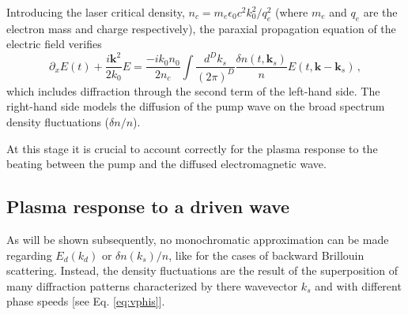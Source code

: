 \documentclass[
 reprint,
 amsmath,amssymb,
 aps,
]{revtex4-1}
\begin{document}
Introducing the laser critical density, $n_c = m_e \epsilon_0c^2 k_0^2/q_e^2 $ (where  $m_e$ and  $q_e$ are the  electron mass and charge respectively), the  paraxial propagation equation of the electric field verifies 
\begin{equation}
    \partial_x E(t) +\frac{i\mathbf{k}^2}{2k_0}E=\frac{-ik_0n_0}{2n_c} \int \frac{d^Dk_s}{(2\pi)^D} \frac{\delta n(t,\mathbf{k}_s)}{n} E(t,\mathbf{k}-\mathbf{k}_s) \, ,\label{eq:parax}
\end{equation}
which includes diffraction through the second term of the left-hand side.  
The right-hand side models the  diffusion  of the pump wave  on the broad spectrum density fluctuations ($\delta n/n$).

At this stage it is crucial to  account correctly for the plasma response to the beating between  the pump and the diffused electromagnetic wave. 

\subsection{Plasma response to a driven wave}
As will be shown subsequently, no monochromatic approximation can be made regarding $E_d(k_d)$ or $\delta n(k_s)/n$, like for the cases of backward Brillouin scattering. Instead, the density fluctuations are the  result of the superposition of many diffraction patterns characterized by there wavevector $k_s$ and with different  phase speeds [see Eq. \eqref{eq:vphis}].
\end{document}
